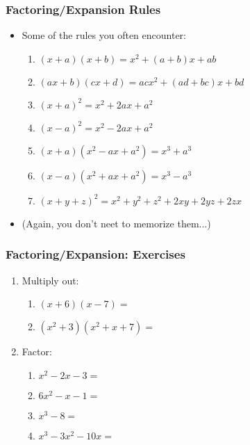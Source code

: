 \documentclass[pdflatex, 12pt]{beamer}
\begin{document}
\begin{frame}
\frametitle{Factoring/Expansion Rules}
\begin{itemize}
\item Some of the rules you often encounter:
 \begin{enumerate} 
 \item $(x + a)(x + b) = x^2 + (a + b)x + ab$
 \item $(ax + b)(cx + d) = acx^2 + (ad + bc)x + bd$
 \item $(x + a)^2 = x^2 + 2ax + a^2$
 \item $(x - a)^2 = x^2 - 2ax + a^2$
 \item $(x + a)(x^2 - ax + a^2) = x^3 + a^3$
 \item $(x - a)(x^2 + ax + a^2) = x^3 - a^3$
 \item $(x + y + z)^2 = x^2 + y^2 + z^2 + 2xy + 2yz + 2zx$
 \end{enumerate}
\vspace{0.4cm}
\item (Again, you don't neet to memorize them...)
\end{itemize}
\end{frame}

\begin{frame}
\frametitle{Factoring/Expansion: Exercises}
\begin{enumerate}
\item Multiply out:
 \begin{enumerate}
 \item $(x + 6)(x - 7) = $
 \item $(x^2 + 3)(x^2 + x + 7) = $
 \end{enumerate}
\vspace{0.4cm}
\item Factor:
 \begin{enumerate}
 \item $x^2 - 2x - 3 = $
 \item $6x^2 - x - 1 = $
 \item $x^3 - 8 = $
 \item $x^3 - 3x^2 - 10x = $
 \end{enumerate}
\end{enumerate}
\end{frame}
\end{document}
